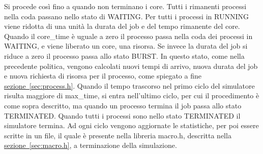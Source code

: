 \documentclass[Lau, oneside]{sapthesis}%
\begin{document}
Si procede così fino a quando non terminano i core.
Tutti i rimanenti processi nella coda passano nello stato di WAITING.
Per tutti i processi in RUNNING viene ridotta di una unità la durata del job e del tempo rimanente del core.
Quando il core\_time è uguale a zero il processo passa nella coda dei processi in WAITING, e viene liberato un core, una risorsa.
Se invece la durata del job si riduce a zero il processo passa allo stato BURST.
In questo stato, come nella precedente politica, vengono calcolati nuovi tempi di arrivo, nuova durata del job e nuova richiesta di risorsa per il processo, come spiegato a fine \hyperref[sec:process.h]{sezione~\ref*{sec:process.h}}.
Quando il tempo trascorso nel primo ciclo del simulatore risulta maggiore di max\_time, si entra nell'ultimo ciclo, per cui il procedimento è come sopra descritto, ma quando un processo termina il job passa allo stato TERMINATED.
Quando tutti i processi sono nello stato TERMINATED il simulatore termina.
Ad ogni ciclo vengono aggiornate le statistiche, per poi essere scritte in un file, il quale è presente nella libreria macro.h, descritta nella \hyperref[sec:macro.h]{sezione~\ref*{sec:macro.h}}, a terminazione della simulazione.
\end{document}

